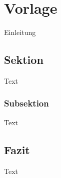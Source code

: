 \chapter{Vorlage}
\label{ch:nn-template}

Einleitung



\section{Sektion}
\label{sec:nn-mm-template-section}

Text



\subsection{Subsektion}
\label{subsec:nn-mm-ll-template-subsection}

Text



\section{Fazit}
\label{sec:nn-mm-template-conclusion}

Text